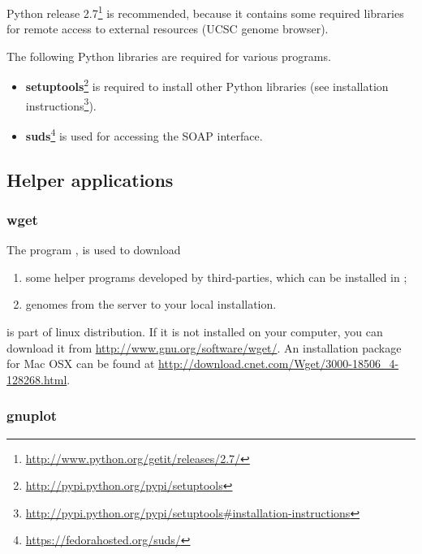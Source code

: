 \documentclass[12pt,a4paper, oneside]{scrreprt} %
\begin{document}
Python release
2.7\footnote{\url{http://www.python.org/getit/releases/2.7/}} is
recommended, because it contains some required libraries for remote
access to external resources (UCSC genome browser).

The following Python libraries are required for various programs.

\begin{itemize}
\item
  \textbf{setuptools}\footnote{\url{http://pypi.python.org/pypi/setuptools}}
  is required to install other Python libraries (see installation
  instructions\footnote{\url{http://pypi.python.org/pypi/setuptools\#installation-instructions}}).

\item \textbf{suds}\footnote{\url{https://fedorahosted.org/suds/}} is
  used for accessing the SOAP interface.

\end{itemize}


\subsection{Helper applications}



\subsubsection{wget}

The program , is used  to download
\begin{enumerate}

\item some helper programs developed by third-parties, which can be
  installed in \RSAT;

\item genomes from the \RSAT server to your local \RSAT installation.

\end{enumerate}

 is part of linux distribution. If it is not installed
on your computer, you can download it from
\url{http://www.gnu.org/software/wget/}.  An installation package for
Mac OSX can be found at
\url{http://download.cnet.com/Wget/3000-18506_4-128268.html}.


\subsubsection{gnuplot}
\end{document}
